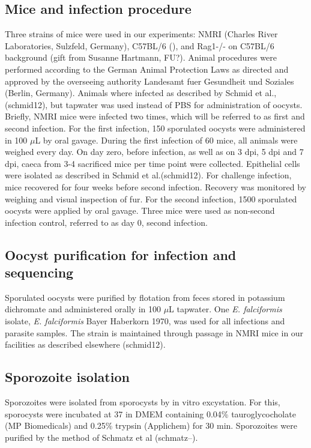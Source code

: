 \documentclass{bmcart}
\begin{document}
\subsection*{Mice and infection procedure}
Three strains of mice were used in our experiments: NMRI (Charles
River Laboratories, Sulzfeld, Germany), C57BL/6 (), and Rag1-/- on
C57BL/6 background (gift from Susanne Hartmann, FU?).  Animal
procedures were performed according to the German Animal Protection
Laws as directed and approved by the overseeing authority Landesamt
fuer Gesundheit und Soziales (Berlin, Germany). Animals where infected
as described by Schmid et al., (schmid12), but tapwater was used
instead of PBS for administration of oocysts. Briefly, NMRI mice were
infected two times, which will be referred to as first and second
infection. For the first infection, 150 sporulated oocysts were
administered in 100 $\mu$L by oral gavage. During the first infection of
60 mice, all animals were weighed every day. On day zero, before
infection, as well as on 3 dpi, 5 dpi and 7 dpi, caeca from 3-4 sacrificed mice per time point were
collected. Epithelial cells were isolated as described in Schmid et
al.(schmid12). For challenge infection, mice recovered for four weeks
before second infection.  Recovery was monitored by weighing and
visual inspection of fur. For the second infection, 1500 sporulated
oocysts were applied by oral gavage. Three mice were used as
non-second infection control, referred to as day 0, second infection.

\subsection*{Oocyst purification for infection and sequencing}
Sporulated oocysts were purified by flotation from feces stored in
potassium dichromate and administered orally in 100 $\mu$L tapwater. One
\textit{E. falciformis} isolate, \textit{E. falciformis} Bayer
Haberkorn 1970, was used for all infections and parasite samples. The
strain is maintained through passage in NMRI mice in our facilities as
described elsewhere (schmid12).

\subsection*{Sporozoite isolation}
Sporozoites were isolated from sporocysts by in vitro excystation. For this,
sporocysts were incubated at 37\newcommand{\degree}C in DMEM containing 0.04\%
tauroglycocholate (MP Biomedicals) and 0.25\% trypsin (Applichem) for
30 min. Sporozoites were purified by the method of Schmatz et al
(schmatz--).
\end{document}
